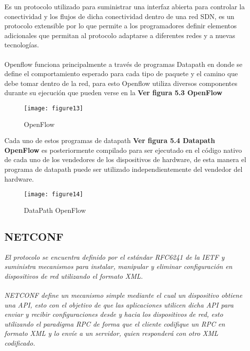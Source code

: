 Es un protocolo utilizado para suministrar una interfaz abierta para controlar la conectividad y los flujos de dicha conectividad dentro de una red SDN, es un protocolo extensible por lo que permite a los programadores definir elementos adicionales que permitan al protocolo adaptarse a diferentes redes y a nuevas tecnologías. 
\\
\\
Openflow funciona principalmente a través de programas Datapath en donde se define el comportamiento esperado para cada tipo de paquete y el camino que debe tomar dentro de la red, para esto Openflow utiliza diversos componentes durante su ejecución que pueden verse en la \textbf{Ver figura 5.3 OpenFlow}
\\
\begin{figure}[htbp]
  \centering
    {\texttt{[image: figure13]}}%
  \caption{OpenFlow}
  \label{fig:fig2subfig}
\end{figure}
Cada uno de estos programas de datapath \textbf{Ver figura 5.4 Datapath OpenFlow} es posteriormente compilado para ser ejecutado en el código nativo de cada uno de los vendedores de los dispositivos de hardware, de esta manera el programa de datapath puede ser utilizado independientemente del vendedor del hardware.


\begin{figure}[htbp]
  \centering
    {\texttt{[image: figure14]}}%
  \caption{DataPath OpenFlow}
  \label{fig:fig2subfig}
\end{figure}

\subsection{NETCONF}
\label{sec:NETCONF}

\textit{El protocolo se encuentra definido por el estándar RFC6241 de la IETF y suministra mecanismos para instalar, manipular y eliminar configuración en dispositivos de red utilizando el formato XML.
\\
\\
NETCONF define un mecanismo simple mediante el cual un dispositivo obtiene una API, esto con el objetivo de que las aplicaciones utilicen dicha API para enviar y recibir configuraciones desde y hacia los dispositivos de red, esto utilizando el paradigma RPC de forma que el cliente codifique un RPC en formato XML y lo envíe a un servidor, quien responderá con otro XML codificado.}

